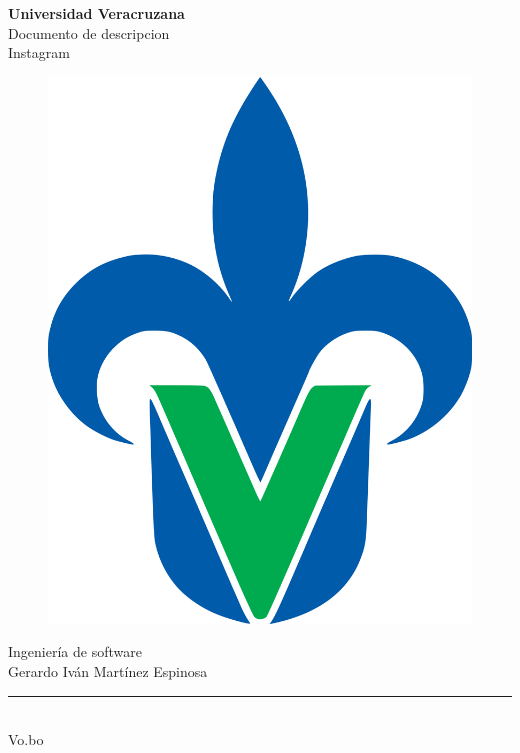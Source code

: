 \begin{titlepage}
	\begin{center}
		{\huge \textbf{Universidad Veracruzana}}\\
		\vspace{2cm}  
		{\Large {Documento de descripcion}}\\
		\vspace{5mm}	
		{\Large {Instagram}}\\
		\begin{figure}[h]
			\centering
			\includegraphics[scale=0.10]{uvlogo}
		\end{figure}
		{\Large {Ingeniería de software}}\\
		\vspace{2cm}
		{\Large {Gerardo Iván Martínez Espinosa}}\\
		\vspace{25mm}	
		\rule{8cm}{0.5mm} \\ \Large Vo.bo\\ 
	\end{center}
\end{titlepage}